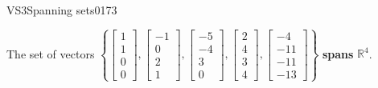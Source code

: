 \begin{exercise}{VS3}{Spanning sets}{0173}
\begin{exerciseAnswer}
 

 The set of vectors \(\left\{ \left[\begin{array}{c}
1 \\
1 \\
0 \\
0
\end{array}\right] , \left[\begin{array}{c}
-1 \\
0 \\
2 \\
1
\end{array}\right] , \left[\begin{array}{c}
-5 \\
-4 \\
3 \\
0
\end{array}\right] , \left[\begin{array}{c}
2 \\
4 \\
3 \\
4
\end{array}\right] , \left[\begin{array}{c}
-4 \\
-11 \\
-11 \\
-13
\end{array}\right] \right\}\) \textbf{spans} \(\mathbb{R}^4\). 

 \end{exerciseAnswer}
 \end{exercise}


\newpage




